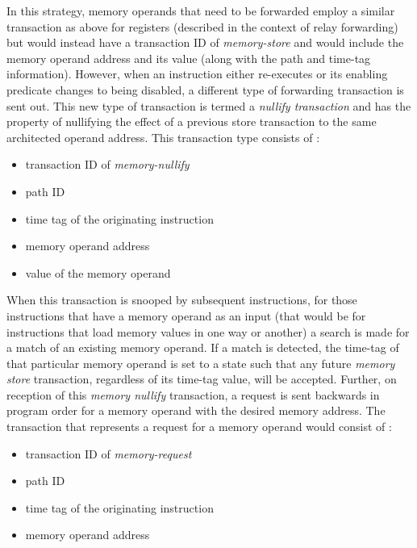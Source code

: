 \documentclass[10pt,twocolumn]{article}
\begin{document}
In this strategy, memory operands that need to be forwarded
employ a similar transaction as above for registers (described
in the context of relay forwarding) but would instead have
a transaction ID of \textit{memory-store} and would
include the memory operand address and its value (along with the
path and time-tag information).
However, when an instruction either re-executes or
its enabling predicate changes to being disabled, a different
type of forwarding transaction is sent out.
This new type of transaction is termed a \textit{nullify transaction}
and has the property of nullifying the effect of a previous
store transaction to the same architected operand address.
This transaction type consists of :
%
\begin{itemize}
\vspace{-0.15in}
\item{transaction ID of \textit{memory-nullify}}
\vspace{-0.15in}
\item{path ID}
\vspace{-0.15in}
\item{time tag of the originating instruction}
\vspace{-0.15in}
\item{memory operand address}
\vspace{-0.15in}
\item{value of the memory operand}
\vspace{-0.15in}
\end{itemize}   
%
When this transaction is snooped by subsequent instructions,
for those instructions that have a memory operand as an input
(that would be for instructions that load memory values in
one way or another)
a search is made for a match of an existing memory
operand.  If a match is detected,
the time-tag of that particular memory operand is set to
a state such that any future \textit{memory store} transaction,
regardless of its time-tag value, will be accepted.
Further, on reception of this \textit{memory nullify} transaction,
a request is sent backwards in program order for a memory
operand with the desired memory address.
The transaction that represents a request for a memory
operand would consist of :
%
\begin{itemize}
\vspace{-0.15in}
\item{transaction ID of \textit{memory-request}}
\vspace{-0.15in}
\item{path ID}
\vspace{-0.15in}
\item{time tag of the originating instruction}
\vspace{-0.15in}
\item{memory operand address}
\vspace{-0.15in}
\end{itemize}   
\end{document}

